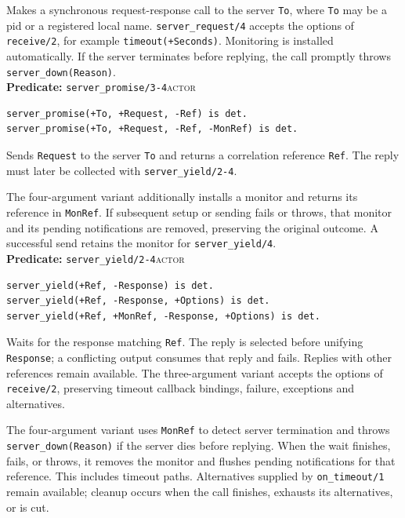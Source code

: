 \noindent Makes a synchronous request-response call to the server
\texttt{To}, where \texttt{To} may be a pid or a registered local name.
\texttt{server\_\allowbreak{}request/\allowbreak{}4} accepts the options of
\texttt{receive/\allowbreak{}2}, for example \texttt{timeout(\allowbreak{}+Seconds)}. Monitoring is
installed automatically. If the server terminates before replying, the call
promptly throws \texttt{server\_\allowbreak{}down(\allowbreak{}Reason)}.\\


\noindent \textbf{Predicate:} \texttt{server\_\allowbreak{}promise/\allowbreak{}3-4}\hfill\textsc{actor}

\begin{verbatim}
server_promise(+To, +Request, -Ref) is det.
server_promise(+To, +Request, -Ref, -MonRef) is det.
\end{verbatim}

Sends \texttt{Request} to the server \texttt{To} and returns a correlation reference \texttt{Ref}.
The reply must later be collected with \texttt{server\_\allowbreak{}yield/\allowbreak{}2-4}.

The four-argument variant additionally installs a monitor and returns its reference in
\texttt{MonRef}. If subsequent setup or sending fails or throws, that monitor and
its pending notifications are removed, preserving the original outcome. A
successful send retains the monitor for \texttt{server\_\allowbreak{}yield/\allowbreak{}4}.\\


\noindent \textbf{Predicate:} \texttt{server\_\allowbreak{}yield/\allowbreak{}2-4}\hfill\textsc{actor}

\begin{verbatim}
server_yield(+Ref, -Response) is det.
server_yield(+Ref, -Response, +Options) is det.
server_yield(+Ref, +MonRef, -Response, +Options) is det.
\end{verbatim}

Waits for the response matching \texttt{Ref}. The reply is selected before unifying
\texttt{Response}; a conflicting output consumes that reply and fails. Replies with other references
remain available. The three-argument variant accepts the options of \texttt{receive/\allowbreak{}2},
preserving timeout callback bindings, failure, exceptions and alternatives.

The four-argument variant uses \texttt{MonRef} to detect server termination and throws
\texttt{server\_\allowbreak{}down(\allowbreak{}Reason)} if the server dies before replying. When the wait finishes, fails, or
throws, it removes the monitor and flushes pending notifications for that reference. This includes
timeout paths. Alternatives supplied by \texttt{on\_\allowbreak{}timeout/\allowbreak{}1} remain available; cleanup occurs when
the call finishes, exhausts its alternatives, or is cut.

